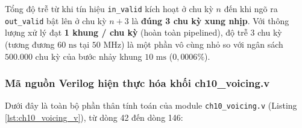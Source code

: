 Tổng độ trễ từ khi tín hiệu \texttt{in\_valid} kích hoạt ở chu kỳ $n$ đến khi ngõ ra \texttt{out\_valid} bật lên ở chu kỳ $n+3$ là \textbf{đúng 3 chu kỳ xung nhịp}. Với thông lượng xử lý đạt \textbf{1 khung / chu kỳ} (hoàn toàn pipelined), độ trễ 3 chu kỳ (tương đương $60\text{ ns}$ tại $50\text{ MHz}$) là một phần vô cùng nhỏ so với ngân sách $500.000\text{ chu kỳ}$ của bước nhảy khung $10\text{ ms}$ ($0{,}0006\%$).

\subsubsection*{Mã nguồn Verilog hiện thực hóa khối ch10\_voicing.v}
Dưới đây là toàn bộ phần thân tính toán của module \texttt{ch10\_voicing.v} (Listing \ref{lst:ch10_voicing_v}), từ dòng 42 đến dòng 146:



